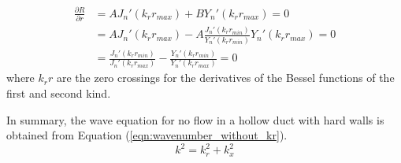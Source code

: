 \begin{frame}
\begin{align*} 
    \frac{ \partial R}{\partial r} &= AJ_n'(k_r r_{max}) + B Y_n' (k_r r_{max}) = 0 \\
                                   &= AJ_n'(k_r r_{max}) - A\frac{J_n' (k_r r_{min})}{Y_n'(k_r r_{min})} Y_n' (k_r r_{max}) = 0 \\
                                   &= \frac{J_n'(k_r r_{min})}{J_n' (k_r r_{max})} - \frac{Y_n'(k_r r_{min})}{Y_n' (k_r r_{max})} = 0 
\end{align*}
where $k_r r$ are the zero crossings for the derivatives of the Bessel functions of the first and second kind.

In summary, the wave equation for no flow in a hollow duct with hard walls is obtained 
from Equation (\ref{eqn:wavenumber_without_kr}).
\begin{equation}
    k^2 = k_r^2 + k_x^2
    \label{eqn:wavenumber_equation}
\end{equation}

\end{frame}


